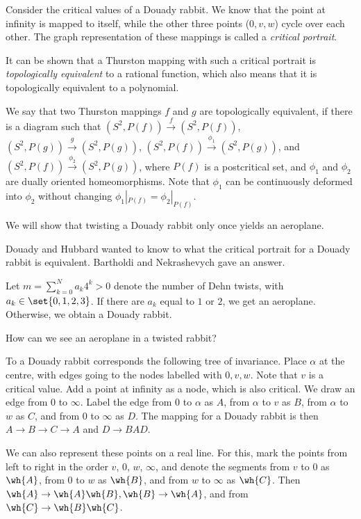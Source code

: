 \documentclass[11pt]{scrartcl}
\begin{document}
  Consider the critical values of a Douady rabbit. We know that the
  point at infinity is mapped to itself, while the other three points
  ($0, v, w$) cycle over each other. The graph representation of these
  mappings is called a \textit{critical portrait}.

  It can be shown that a Thurston mapping with such a critical
  portrait is \textit{topologically equivalent} to a rational
  function, which also means that it is topologically equivalent
  to a polynomial.

  We say that two Thurston mappings $f$ and $g$ are topologically
  equivalent, if there is a diagram such that
  $(S^{2}, P(f)) \overset{f}{\to} (S^{2}, P(f))$,
  $(S^{2}, P(g)) \overset{g}{\to} (S^{2}, P(g))$,
  $(S^{2}, P(f)) \overset{\phi_{1}}{\to} (S^{2}, P(g))$, and
  $(S^{2}, P(f)) \overset{\phi_{2}}{\to} (S^{2}, P(g))$, where $P(f)$
  is a postcritical set, and $\phi_{1}$ and $\phi_{2}$ are dually
  oriented homeomorphisms. Note that $\phi_{1}$ can be continuously
  deformed into $\phi_{2}$ without changing
  $\phi_{1}|_{P(f)} = \phi_{2}|_{P(f)}$.

  We will show that twisting a Douady rabbit only once yields an
  aeroplane.

  Douady and Hubbard wanted to know to what the critical portrait for a
  Douady rabbit is equivalent. Bartholdi and Nekrashevych gave an answer.

  Let $m = \sum_{k=0}^{N}a_{k}4^{k} > 0$ denote the number of Dehn
  twists, with $a_{k}\in \set{0, 1, 2, 3}$. If there are $a_{k}$ equal
  to $1$ or $2$, we get an aeroplane. Otherwise, we obtain a Douady
  rabbit.

  How can we see an aeroplane in a twisted rabbit?

  To a Douady rabbit corresponds the following tree of invariance.
  Place $\alpha$ at the centre, with edges going to the nodes labelled
  with $0, v, w$. Note that $v$ is a critical value. Add a point at
  infinity as a node, which is also critical. We draw an edge from $0$
  to $\infty$. Label the edge from $0$ to $\alpha$ as $A$, from
  $\alpha$ to $v$ as $B$, from $\alpha$ to $w$ as $C$, and from $0$ to
  $\infty$ as $D$. The mapping for a Douady rabbit is then
  $A \to B \to C \to A$ and $D\to BAD$.

  We can also represent these points on a real line. For this, mark
  the points from left to right in the order $v$, $0$, $w$, $\infty$,
  and denote the segments from $v$ to $0$ as $\wh{A}$, from $0$ to $w$
  as $\wh{B}$, and from $w$ to $\infty$ as $\wh{C}$. Then
  $\wh{A} \to \wh{A}\wh{B}, \wh{B} \to \wh{A}$, and from
  $\wh{C} \to \wh{B}\wh{C}$.
\end{document}
